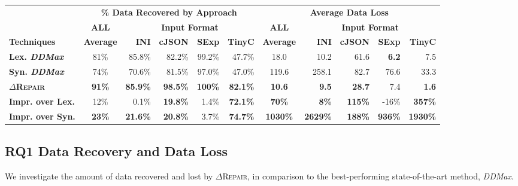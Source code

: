 \documentclass[acmsmall,screen,review,anonymous]{acmart}
\newcommand{\approach}{\textsc{$\Delta$Repair}\xspace}
\newcommand{\ddmax}{\textit{DDMax}\xspace}
\begin{document}
\begin{table*}[!tbp]\centering
\caption{Data Recovery (file size difference) and Data Loss  (Levenshtein distance) of \approach vs. %
lexical (Lex.) \ddmax and syntactic (Syn.) \ddmax. 
The highest data recovery and lowest data loss are in bold, percentage improvement (Impr.) %
of \approach over the best baseline which are significant (i.e., greater than five percent ($>$5\%)) are also in bold.
}
\footnotesize
\begin{tabular}{|l | c |  r  r  r  r  | c |  r  r  r  r |}
\hline
 &  \multicolumn{5}{c|}{\textbf{\% Data Recovered by Approach}} &  \multicolumn{5}{c|}{\textbf{Average Data Loss }}  \\
&  \multicolumn{1}{c|}{\textbf{ALL}} & \multicolumn{4}{c|}{\textbf{Input Format}}  &  \multicolumn{1}{c|}{\textbf{ALL}} & \multicolumn{4}{c|}{\textbf{Input Format}}  \\
\textbf{Techniques} & \textbf{Average} & \textbf{INI} & \textbf{cJSON} & \textbf{SExp} & \textbf{TinyC} & \textbf{Average} & \textbf{INI} & \textbf{cJSON} & \textbf{SExp} & \textbf{TinyC} \\
\hline
\textbf{Lex. \ddmax} & 81\%  & 85.8\% & 82.2\%	 & 99.2\%	& 47.7\% & 18.0 & {10.2} &	61.6 &	\textbf{6.2} & 7.5 \\			
\textbf{Syn. \ddmax} & 74\%  &  70.6\% & 81.5\%  & 97.0\%	& 47.0\% & 119.6 &  258.1 & 82.7 &	76.6 &	33.3 \\	
\hline
\textbf{\approach} & \textbf{91\%}  &  \textbf{85.9\%} & \textbf{98.5\%} & \textbf{100\%} & \textbf{82.1\%} & \textbf{10.6}  & \textbf{9.5} &	\textbf{28.7} &	7.4 & \textbf{1.6} \\
\hline
\textbf{Impr. over Lex.} & 12\% &  0.1\%	& \textbf{19.8\%}	& 1.4\%	& \textbf{72.1\%} & \textbf{70\%} &  \textbf{8\%} & \textbf{115\%} & -16\% & \textbf{357\%} \\
\textbf{Impr. over Syn.} & \textbf{23\%}  &  \textbf{21.6\%} 	& \textbf{20.8\%}	& 3.7\%	& \textbf{74.7\% }  & \textbf{1030\%} & \textbf{2629\%} &	\textbf{188\%} & \textbf{936\%} &\textbf{ 1930\%} \\
\hline
\end{tabular}
\label{tab:data-recovery-and-loss}
\end{table*}


\subsection{RQ1 Data Recovery and Data Loss} 
We investigate the amount of data recovered and lost by \approach, in comparison to
the best-performing state-of-the-art method, \ddmax. 
\end{document}
